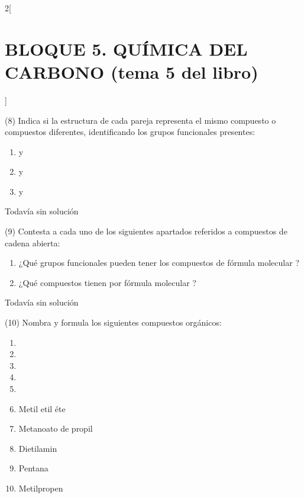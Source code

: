 \documentclass[10pt]{article}
\begin{document}
\begin{multicols}{2}[
  \section{BLOQUE 5. QUÍMICA DEL CARBONO (tema 5 del libro)}
  ]
\begin{exercise}
  (8) Indica si la estructura de cada pareja representa el mismo
  compuesto o compuestos diferentes, identificando los grupos
  funcionales presentes:
  \begin{enumerate}
    \item {} y 
    \item {} y 
    \item {} y 
  \end{enumerate}
\end{exercise}

\begin{solution}[print=false]
  Todavía sin solución
\end{solution}

\begin{exercise}
  (9) Contesta a cada uno de los siguientes apartados referidos a
  compuestos de cadena abierta:
  \begin{enumerate}
    \item ¿Qué grupos funcionales pueden tener los compuestos de
    fórmula molecular ?
    \item ¿Qué compuestos tienen por fórmula molecular ?
  \end{enumerate}
\end{exercise}

\begin{solution}[print=false]
  Todavía sin solución
\end{solution}

\begin{exercise}
  (10) Nombra y formula los siguientes compuestos orgánicos:
  \begin{enumerate}
    \item {}
    \item {}
    \item {}
    \item {}
    \item {}
    \item Metil etil éte
    \item Metanoato de propil
    \item Dietilamin
    \item Pentana
    \item Metilpropen
  \end{enumerate}
\end{exercise}


\end{multicols}
\end{document}
